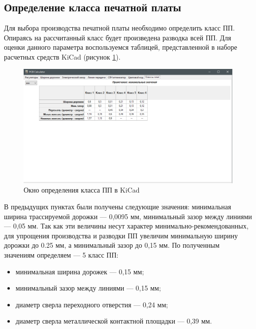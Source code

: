 \documentclass[utf8x, 14pt, oneside, a4paper]{article}
\begin{document}
		\subsection{Определение класса печатной платы}
		
		Для выбора производства печатной платы необходимо определить класс ПП. Опираясь на рассчитанный класс будет произведена разводка всей ПП. Для оценки данного параметра воспользуемся таблицей, представленной в наборе расчетных средств KiCad \cite{bib:kicad} (рисунок \ref{fig:kicad-calc-class}).
		
		\begin{figure}[H]
			\centering
			\includegraphics[width=0.9\linewidth]{"Рисунки/KiCad-Calc-class"}
			\caption{Окно определения класса ПП в KiCad}
			\label{fig:kicad-calc-class}
		\end{figure}
	
		В предыдущих пунктах были получены следующие значения: минимальная ширина трассируемой дорожки --- 0,0095 мм, минимальный зазор между линиями --- 0,05 мм. Так как эти величины несут характер минимально-рекомендованных, для упрощения производства и разводки ПП увеличим минимальную ширину дорожки до 0.25 мм, а минимальный зазор до 0,15 мм. По полученным значениям определяем --- 5 класс ПП:
		
		\begin{itemize}
			\item минимальная ширина дорожек --- 0,15 мм;
			\item минимальный зазор между линиями --- 0,15 мм;
			\item диаметр сверла переходного отверстия --- 0,24 мм;
			\item диаметр сверла металлической контактной площадки --- 0,39 мм.
		\end{itemize}
	
	\pagebreak
	
\end{document}
